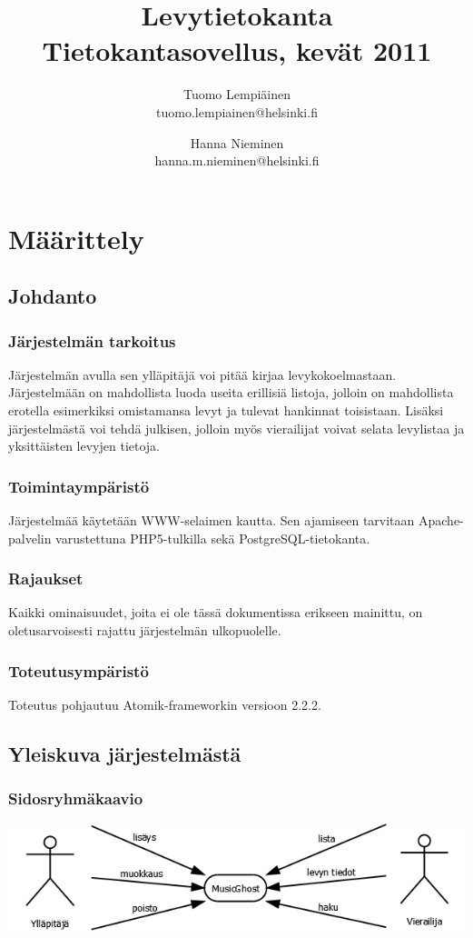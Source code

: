 \documentclass[a4paper,12pt]{report}
\title{Levytietokanta\\
  \large{Tietokantasovellus, kevät 2011}\\}
\author{Tuomo Lempiäinen\\tuomo.lempiainen@helsinki.fi \and
Hanna Nieminen\\hanna.m.nieminen@helsinki.fi}
\begin{document}
\maketitle

\tableofcontents

\chapter{Määrittely}

\section{Johdanto}

\subsection{Järjestelmän tarkoitus}
Järjestelmän avulla sen ylläpitäjä voi pitää kirjaa levykokoelmastaan.
Järjestelmään on mahdollista luoda useita erillisiä listoja, jolloin on
mahdollista erotella esimerkiksi omistamansa levyt ja tulevat hankinnat
toisistaan.  Lisäksi järjestelmästä voi tehdä julkisen, jolloin myös vierailijat
voivat selata levylistaa ja yksittäisten levyjen tietoja.

\subsection{Toimintaympäristö}
Järjestelmää käytetään WWW-selaimen kautta. Sen ajamiseen tarvitaan
Apache-palvelin varustettuna PHP5-tulkilla sekä PostgreSQL-tietokanta.

\subsection{Rajaukset}
Kaikki ominaisuudet, joita ei ole tässä dokumentissa erikseen mainittu, on
oletusarvoisesti rajattu järjestelmän ulkopuolelle.

\subsection{Toteutusympäristö}
Toteutus pohjautuu Atomik-frameworkin versioon 2.2.2.

\section{Yleiskuva järjestelmästä}

\subsection{Sidosryhmäkaavio}
\vspace{1em}
\includegraphics[width=\linewidth]{sidosryhmakaavio}
\end{document}
